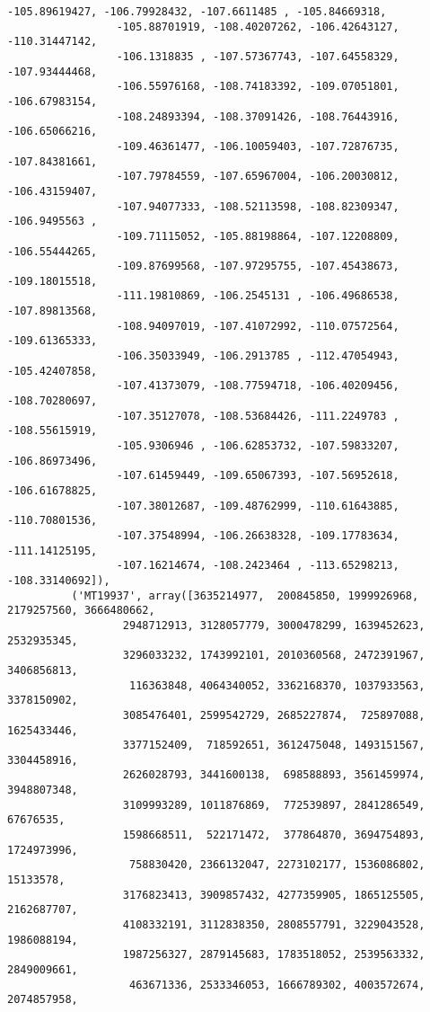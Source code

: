 \documentclass[11pt]{article}
\begin{document}
\begin{Verbatim}[commandchars=\\\{\}]
                 -105.89619427, -106.79928432, -107.6611485 , -105.84669318,
                 -105.88701919, -108.40207262, -106.42643127, -110.31447142,
                 -106.1318835 , -107.57367743, -107.64558329, -107.93444468,
                 -106.55976168, -108.74183392, -109.07051801, -106.67983154,
                 -108.24893394, -108.37091426, -108.76443916, -106.65066216,
                 -109.46361477, -106.10059403, -107.72876735, -107.84381661,
                 -107.79784559, -107.65967004, -106.20030812, -106.43159407,
                 -107.94077333, -108.52113598, -108.82309347, -106.9495563 ,
                 -109.71115052, -105.88198864, -107.12208809, -106.55444265,
                 -109.87699568, -107.97295755, -107.45438673, -109.18015518,
                 -111.19810869, -106.2545131 , -106.49686538, -107.89813568,
                 -108.94097019, -107.41072992, -110.07572564, -109.61365333,
                 -106.35033949, -106.2913785 , -112.47054943, -105.42407858,
                 -107.41373079, -108.77594718, -106.40209456, -108.70280697,
                 -107.35127078, -108.53684426, -111.2249783 , -108.55615919,
                 -105.9306946 , -106.62853732, -107.59833207, -106.86973496,
                 -107.61459449, -109.65067393, -107.56952618, -106.61678825,
                 -107.38012687, -109.48762999, -110.61643885, -110.70801536,
                 -107.37548994, -106.26638328, -109.17783634, -111.14125195,
                 -107.16214674, -108.2423464 , -113.65298213, -108.33140692]),
          ('MT19937', array([3635214977,  200845850, 1999926968, 2179257560, 3666480662,
                  2948712913, 3128057779, 3000478299, 1639452623, 2532935345,
                  3296033232, 1743992101, 2010360568, 2472391967, 3406856813,
                   116363848, 4064340052, 3362168370, 1037933563, 3378150902,
                  3085476401, 2599542729, 2685227874,  725897088, 1625433446,
                  3377152409,  718592651, 3612475048, 1493151567, 3304458916,
                  2626028793, 3441600138,  698588893, 3561459974, 3948807348,
                  3109993289, 1011876869,  772539897, 2841286549,   67676535,
                  1598668511,  522171472,  377864870, 3694754893, 1724973996,
                   758830420, 2366132047, 2273102177, 1536086802,   15133578,
                  3176823413, 3909857432, 4277359905, 1865125505, 2162687707,
                  4108332191, 3112838350, 2808557791, 3229043528, 1986088194,
                  1987256327, 2879145683, 1783518052, 2539563332, 2849009661,
                   463671336, 2533346053, 1666789302, 4003572674, 2074857958,

\end{Verbatim}
\end{document}
